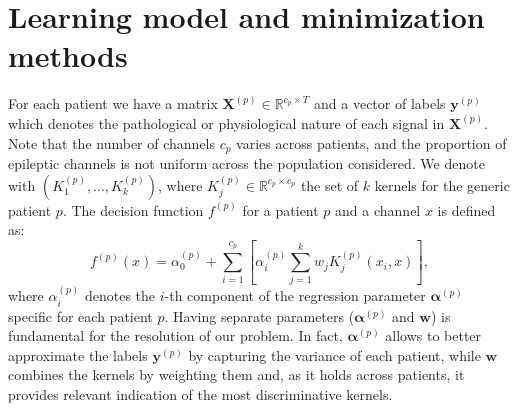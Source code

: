 \documentclass[a4paper]{article}
\begin{document}
\section{Learning model and minimization methods}
For each patient we have a matrix $\bm{X}^{(p)} \in \mathbb{R}^{c_p\times T}$ and a vector of labels $\bm{y}^{(p)}$ which denotes the pathological or physiological nature of each signal in $\bm X^{(p)}$. Note that the number of channels $c_p$ varies across patients, and the proportion of epileptic channels is not uniform across the population considered.
%
We denote with $(K^{(p)}_1, \dots, K^{(p)}_k)$, where $K_j^{(p)} \in\mathbb{R}^{c_p \times c_p}$ the set of $k$ kernels for the generic patient $p$.
%
The decision function $f^{(p)}$ for a patient $p$ and a channel $x$ is defined as:
\begin{equation}
f^{(p)}(x) = \alpha^{(p)}_0 + \sum_{i = 1}^{c_p}\left[\alpha^{(p)}_i \sum_{j=1}^{k} w_j K^{(p)}_j(x_i, x)\right],
\end{equation}
%
where $\alpha^{(p)}_i$ denotes the $i$-th component of the regression parameter  $\bm{\alpha}^{(p)}$ specific for each patient $p$.
%
%
Having separate parameters ($\bm{\alpha}^{(p)}$ and $\bm{w}$) is fundamental for the resolution of our problem. In fact, $\bm{\alpha}^{(p)}$ allows to better approximate the labels $\bm y^{(p)}$ by capturing the variance of each patient, while $\bm{w}$ combines the kernels by weighting them and, as it holds across patients, it provides relevant indication of the most discriminative kernels.
\end{document}
